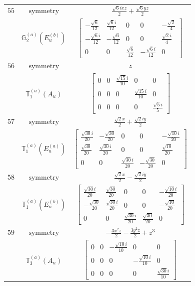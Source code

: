 \documentclass[fleqn,8pt,landscape]{jsarticle}
\begin{document}
\begin{longtable}{ccc}
$ 55 $ & $ \text{symmetry} $ & $ \frac{\sqrt{6} i x z}{2} + \frac{\sqrt{6} y z}{2} $ \\
$  $ & $ \mathbb{G}_{2}^{(a)}(E_{u}^{(b)}) $ & $ \begin{bmatrix} - \frac{\sqrt{6}}{12} & \frac{\sqrt{6} i}{12} & 0 & 0 & - \frac{\sqrt{2}}{4} \\ - \frac{\sqrt{6} i}{12} & - \frac{\sqrt{6}}{12} & 0 & 0 & \frac{\sqrt{2} i}{4} \\ 0 & 0 & \frac{\sqrt{6}}{12} & - \frac{\sqrt{6} i}{12} & 0 \end{bmatrix} $ \\ \hline
$ 56 $ & $ \text{symmetry} $ & $ z $ \\
$  $ & $ \mathbb{T}_{1}^{(a)}(A_{u}) $ & $ \begin{bmatrix} 0 & 0 & \frac{\sqrt{15} i}{10} & 0 & 0 \\ 0 & 0 & 0 & \frac{\sqrt{15} i}{10} & 0 \\ 0 & 0 & 0 & 0 & \frac{\sqrt{5} i}{5} \end{bmatrix} $ \\ \hline
$ 57 $ & $ \text{symmetry} $ & $ \frac{\sqrt{2} x}{2} + \frac{\sqrt{2} i y}{2} $ \\
$  $ & $ \mathbb{T}_{1}^{(a)}(E_{u}^{(a)}) $ & $ \begin{bmatrix} \frac{\sqrt{30} i}{20} & - \frac{\sqrt{30}}{20} & 0 & 0 & - \frac{\sqrt{10} i}{20} \\ \frac{\sqrt{30}}{20} & \frac{\sqrt{30} i}{20} & 0 & 0 & \frac{\sqrt{10}}{20} \\ 0 & 0 & \frac{\sqrt{30} i}{20} & - \frac{\sqrt{30}}{20} & 0 \end{bmatrix} $ \\ \hline
$ 58 $ & $ \text{symmetry} $ & $ \frac{\sqrt{2} x}{2} - \frac{\sqrt{2} i y}{2} $ \\
$  $ & $ \mathbb{T}_{1}^{(a)}(E_{u}^{(b)}) $ & $ \begin{bmatrix} \frac{\sqrt{30} i}{20} & \frac{\sqrt{30}}{20} & 0 & 0 & - \frac{\sqrt{10} i}{20} \\ - \frac{\sqrt{30}}{20} & \frac{\sqrt{30} i}{20} & 0 & 0 & - \frac{\sqrt{10}}{20} \\ 0 & 0 & \frac{\sqrt{30} i}{20} & \frac{\sqrt{30}}{20} & 0 \end{bmatrix} $ \\ \hline
$ 59 $ & $ \text{symmetry} $ & $ - \frac{3 x^{2} z}{2} - \frac{3 y^{2} z}{2} + z^{3} $ \\
$  $ & $ \mathbb{T}_{3}^{(a)}(A_{u}) $ & $ \begin{bmatrix} 0 & 0 & - \frac{\sqrt{10} i}{10} & 0 & 0 \\ 0 & 0 & 0 & - \frac{\sqrt{10} i}{10} & 0 \\ 0 & 0 & 0 & 0 & \frac{\sqrt{30} i}{10} \end{bmatrix} $ \\ \hline

\end{longtable}
\end{document}
